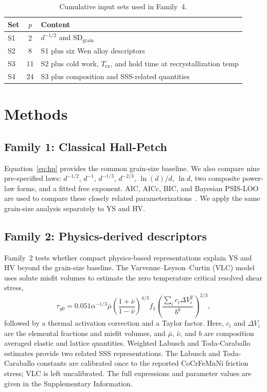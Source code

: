 \documentclass[5p,times,twocolumn]{elsarticle}
\newcommand{\familyone}{Classical Hall-Petch}
\newcommand{\familytwo}{Physics-derived descriptors}
\begin{document}
\begin{table}[H]
\centering
\caption{Cumulative input sets used in Family~4.}
\label{tab:inputs}
\footnotesize
\begin{tabular}{@{}lcp{5.6cm}@{}}
\toprule
Set & $p$ & Content \\
\midrule
S1 & 2 & $d^{-1/2}$ and $\mathrm{SD}_{\mathrm{grain}}$ \\
S2 & 8 & S1 plus six Wen alloy descriptors \\
S3 & 11 & S2 plus cold work, $T_{\mathrm{rx}}$, and hold time at recrystallization temp \\
S4 & 24 & S3 plus composition and SSS-related quantities \\
\bottomrule
\end{tabular}
\end{table}


\section{Methods}
\label{sec:methods}

\subsection{Family 1: \familyone}

Equation~\eqref{eq:hp} provides the common grain-size baseline. We also compare nine pre-specified laws: $d^{-1/2}$, $d^{-1}$, $d^{-1/3}$, $d^{-2/3}$, $\ln(d)/d$, $\ln d$, two composite power-law forms, and a fitted free exponent. AIC, AICc, BIC, and Bayesian PSIS-LOO are used to compare these closely related parameterizations~\cite{Akaike1974,Schwarz1978,Vehtari2017,Yao2018}. We apply the same grain-size analysis separately to YS and HV.

\subsection{Family 2: \familytwo}

Family~2 tests whether compact physics-based representations explain YS and HV beyond the grain-size baseline. The Varvenne--Leyson--Curtin (VLC) model uses solute misfit volumes to estimate the zero temperature critical resolved shear stress,
\begin{equation}
\tau_{y0}=0.051\alpha^{-1/3}\bar\mu
\left(\frac{1+\bar\nu}{1-\bar\nu}\right)^{4/3}f_1
\left(\frac{\sum_i c_i\Delta V_i^2}{b^6}\right)^{2/3},
\label{eq:vlc}
\end{equation}
followed by a thermal activation correction and a Taylor factor. Here, $c_i$ and $\Delta V_i$ are the elemental fractions and misfit volumes, and $\bar\mu$, $\bar\nu$, and $b$ are composition averaged elastic and lattice quantities. Weighted Labusch and Toda-Caraballo estimates provide two related SSS representations. The Labusch and Toda-Caraballo constants are calibrated once to the reported CoCrFeMnNi friction stress; VLC is left uncalibrated. The full expressions and parameter values are given in the Supplementary Information.
\end{document}
